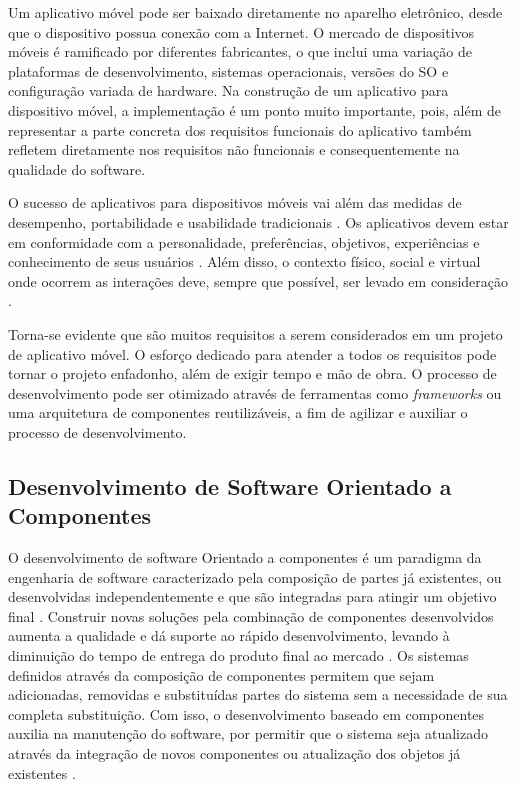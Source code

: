 Um aplicativo móvel pode ser baixado diretamente no aparelho eletrônico, desde que o dispositivo possua conexão com a Internet. O mercado de dispositivos móveis é ramificado por diferentes fabricantes, o que inclui uma variação de plataformas de desenvolvimento, sistemas operacionais, versões do SO e configuração variada de hardware. Na construção de um aplicativo para dispositivo móvel, a implementação é um ponto muito importante, pois, além de representar a parte concreta dos requisitos funcionais do aplicativo também refletem diretamente nos requisitos não funcionais e consequentemente na qualidade do software.\par

O sucesso de aplicativos para dispositivos móveis vai além das medidas de desempenho, portabilidade e usabilidade tradicionais \cite{Kronbauer:2012:UEE:2393536.2393582}. Os aplicativos devem estar em conformidade com a personalidade, preferências, objetivos, experiências e conhecimento de seus usuários \cite{Vermeeren:2010:UEE:1868914.1868973}. Além disso, o contexto físico, social e virtual onde ocorrem as interações deve, sempre que possível, ser levado em consideração \cite{McCarthy:2004:TE:1015530.1015549}.\par

Torna-se evidente que são muitos requisitos a serem considerados em um projeto de aplicativo móvel. O esforço dedicado para atender a todos os requisitos pode tornar o projeto enfadonho, além de exigir tempo e mão de obra. O processo de desenvolvimento pode ser otimizado através de ferramentas como \textit{frameworks} ou uma arquitetura de componentes reutilizáveis, a fim de agilizar e auxiliar o processo de desenvolvimento.


\subsection{Desenvolvimento de Software Orientado a Componentes}
O desenvolvimento de software Orientado a componentes é um paradigma da engenharia de software caracterizado pela composição de partes já existentes, ou desenvolvidas independentemente e que são integradas para atingir um objetivo final \cite{rafael_heider}. Construir novas soluções pela combinação de componentes desenvolvidos aumenta a qualidade e dá suporte ao rápido desenvolvimento, levando à diminuição do tempo de entrega do produto final ao mercado \cite{rafael_heider}. Os sistemas definidos através da composição de componentes permitem que sejam adicionadas, removidas e substituídas partes do sistema sem a necessidade de sua completa substituição. Com isso, o desenvolvimento baseado em componentes auxilia na manutenção do software, por permitir que o sistema seja atualizado através da integração de novos componentes ou atualização dos objetos já existentes \cite{szyperski_bosch_weck_1999}.\par

